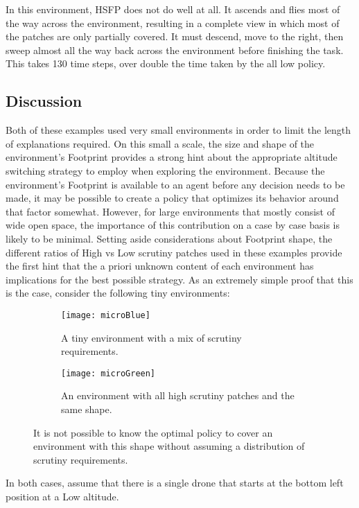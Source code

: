 In this environment, HSFP does not do well at all. It ascends and flies most of the way across the environment, resulting in a complete view in which most of the patches are only partially covered. It must descend, move to the right, then sweep almost all the way back across the environment before finishing the task. This takes 130 time steps, over double the time taken by the all low policy.

\subsection{Discussion}

Both of these examples used very small environments in order to limit the length of explanations required. On this small a scale, the size and shape of the environment's Footprint provides a strong hint about the appropriate altitude switching strategy to employ when exploring the environment. Because the environment's Footprint is available to an agent before any decision needs to be made, it may be possible to create a policy that optimizes its behavior around that factor somewhat. However, for large environments that mostly consist of wide open space, the importance of this contribution on a case by case basis is likely to be minimal. Setting aside considerations about Footprint shape, the different ratios of High vs Low scrutiny patches used in these examples provide the first hint that the a priori unknown content of each environment has implications for the best possible strategy. As an extremely simple proof that this is the case, consider the following tiny environments:

\begin{figure}[H]
\begin{subfigure}{.5\textwidth}
  \centering
  \texttt{[image: microBlue]}
  \caption{A tiny environment with a mix of scrutiny requirements.}
\end{subfigure}
\begin{subfigure}{.5\textwidth}
  \centering
  \texttt{[image: microGreen]}
  \caption{An environment with all high scrutiny patches and the same shape.}
\end{subfigure}
\caption[Minimal Environments with Uncertain Policies]{It is not possible to know the optimal policy to cover an environment with this shape without assuming a distribution of scrutiny requirements.}
\end{figure}

In both cases, assume that there is a single drone that starts at the bottom left position at a Low altitude.

